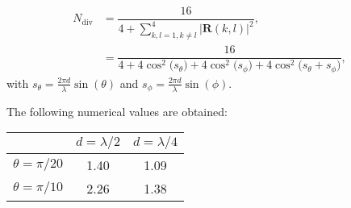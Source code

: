 \documentclass [a4paper, 11pt] {article}
\begin{document}
\begin{solution}
\begin{enumerate}
\begin{itemize}
    \begin{align}
        N_{\text{div}} &= \dfrac{16}{4+ \sum_{k,l=1,k \neq l}^{4} |\mathbf{R}(k,l)|^2}, \\
        &= \dfrac{16}{4+ 4\cos^2\Big(s_\theta\Big) + 4\cos^2\Big(s_\phi\Big) + 4\cos^2\Big(s_\theta + s_\phi\Big)},
    \end{align}
    with $s_\theta = \frac{2\pi d}{\lambda}\sin(\theta)$ and $s_\phi = \frac{2\pi d}{\lambda}\sin(\phi)$.

    The following numerical values are obtained:

    \begin{center}
    \begin{tabular}{ |c|c|c| }
     \hline
     & $d = \lambda/2$ & $d = \lambda/4$ \\
     \hline
    $\theta = \pi/20$ & 1.40 & 1.09 \\
    $\theta = \pi/10$ & 2.26 & 1.38 \\
    \hline
    \end{tabular}
    \end{center}

    \end{itemize}

\end{enumerate}
    \end{solution}
\end{document}
